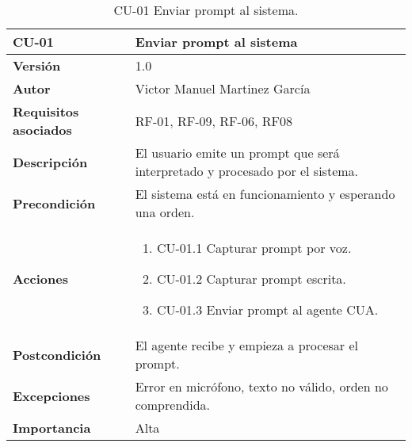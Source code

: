 \begin{table}[p]
    \centering
    \begin{tabularx}{\linewidth}{ p{} p{} }
        \toprule
        \textbf{CU-01}    & \textbf{Enviar prompt al sistema}\\
        \toprule
        \textbf{Versión}              & 1.0    \\
        \textbf{Autor}                & Victor Manuel Martinez García \\
        \textbf{Requisitos asociados} & RF-01, RF-09, RF-06, RF08 \\
        \textbf{Descripción}          & El usuario emite un prompt que será interpretado y procesado por el sistema.\\
        \textbf{Precondición}         & El sistema está en funcionamiento y esperando una orden.\\
        \textbf{Acciones}             &
        \begin{enumerate}
          \item CU-01.1 Capturar prompt por voz.
          \item CU-01.2 Capturar prompt escrita.
          \item CU-01.3 Enviar prompt al agente CUA.
        \end{enumerate}\\
        \textbf{Postcondición}        & El agente recibe y empieza a procesar el prompt.\\
        \textbf{Excepciones}          & Error en micrófono, texto no válido, orden no comprendida.\\
        \textbf{Importancia}          & Alta \\
        \bottomrule
    \end{tabularx}
    \caption{CU-01 Enviar prompt al sistema.}
    \label{CU-01 Enviar prompt al sistema}
\end{table}


